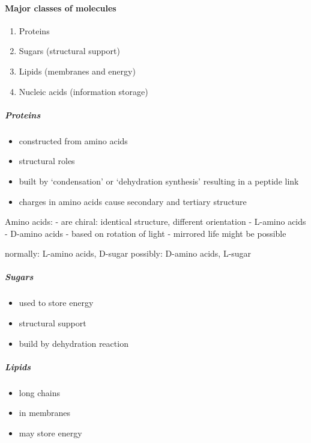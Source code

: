 \hypertarget{major-classes-of-molecules}{%
\paragraph{Major classes of
molecules}\label{major-classes-of-molecules}}

\begin{enumerate}
\def\labelenumi{\arabic{enumi}.}
\tightlist
\item
  Proteins
\item
  Sugars (structural support)
\item
  Lipids (membranes and energy)
\item
  Nucleic acids (information storage)
\end{enumerate}

\hypertarget{proteins}{%
\subparagraph{Proteins}\label{proteins}}

\begin{itemize}
\tightlist
\item
  constructed from amino acids
\item
  structural roles
\item
  built by `condensation' or `dehydration synthesis' resulting in a
  peptide link
\item
  charges in amino acids cause secondary and tertiary structure
\end{itemize}

Amino acids: - are chiral: identical structure, different orientation -
L-amino acids - D-amino acids - based on rotation of light - mirrored
life might be possible

normally: L-amino acids, D-sugar possibly: D-amino acids, L-sugar

\hypertarget{sugars}{%
\subparagraph{Sugars}\label{sugars}}

\begin{itemize}
\tightlist
\item
  used to store energy
\item
  structural support
\item
  build by dehydration reaction
\end{itemize}

\hypertarget{lipids}{%
\subparagraph{Lipids}\label{lipids}}

\begin{itemize}
\tightlist
\item
  long chains
\item
  in membranes
\item
  may store energy
\end{itemize}

